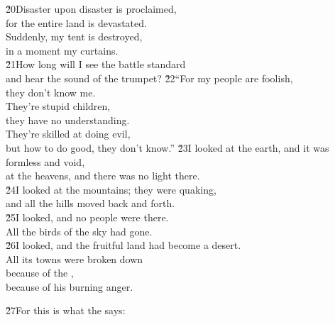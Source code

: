 \begin{poetry}
\poeml \v{20}Disaster upon disaster is proclaimed, \\
\poemll    for the entire land is devastated. \\
\poeml Suddenly, my tent is destroyed, \\
\poemll    in a moment my curtains. \\
\poeml \v{21}How long will I see the battle standard \\
\poemll    and hear the sound of the trumpet?
\poeml \v{22}``For my people are foolish, \\
\poemll    they don't know me. \\
\poeml They're stupid children, \\
\poemll    they have no understanding. \\
\poeml They're skilled at doing evil, \\
\poemll    but how to do good, they don't know.''
\poeml \v{23}I looked at the earth, and it was formless and void, \\
\poemll    at the heavens, and there was no light there. \\
\poeml \v{24}I looked at the mountains; they were quaking, \\
\poemll    and all the hills moved back and forth. \\
\poeml \v{25}I looked, and no people were there. \\
\poemll    All the birds of the sky had gone. \\
\poeml \v{26}I looked, and the fruitful land had become a desert. \\
\poemll    All its towns were broken down \\
\poeml because of the , \\
\poemll    because of his burning anger.
\end{poetry}

\begin{poetry}
\poeml \v{27}For this is what the  says:
\end{poetry}

